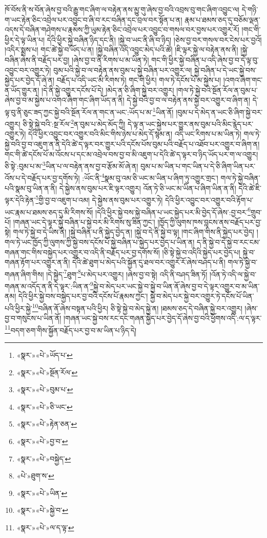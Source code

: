 ཁོ་བོས་ནི་ས་བོན་ཞེས་བྱ་བའི་རྒྱུ་གང་ཞིག་ལ་བརྟེན་ནས་མྱུ་གུ་ཞེས་བྱ་བའི་འབྲས་བུ་གང་ཞིག་འབྱུང་ལ། དེ་གཉི་ག་ཡང་རྟེན་ཅིང་འབྲེལ་པར་འབྱུང་བ་ཞི་བ་རང་བཞིན་དང་བྲལ་བར་སྟོན་པ་ན། རྣམ་པ་ཐམས་ཅད་དུ་བཅོམ་ལྡན་འདས་དེ་བཞིན་གཤེགས་པ་རྣམས་ཀྱི་ཡུམ་རྟེན་ཅིང་འབྲེལ་པར་འབྱུང་བ་གསལ་བར་བྱས་པར་འགྱུར་རོ། །གང་གི་ཕྱིར་དེ་ལྟ་ཡིན་པ། དེའི་ཕྱིར་སྐྱེ་བཞིན་ཉིད་དང་ནི། །སྐྱེ་བ་ཡང་ནི་ཞི་བ་ཉིད། །ཅེས་བྱ་བར་གསལ་བར་ངེས་པར་བྱའོ། །འདིར་སྨྲས་པ། གང་ཚེ་སྐྱེ་བ་ཡོད་པ་ན། །སྐྱེ་བཞིན་འདི་འབྱུང་མེད་པའི་ཚེ། །ཇི་ལྟར་སྐྱེ་ལ་བརྟེན་ནས་ནི། །སྐྱེ་བཞིན་ཞེས་ནི་བརྗོད་པར་བྱ། །ཞེས་བྱ་བ་ནི་རིགས་པ་མ་ཡིན་ཏེ། གང་གི་ཕྱིར་སྐྱེ་བཞིན་པ་འདི་ཞེས་བྱ་བ་དེ་ལྟ་བུ་འབྱུང་བར་འགྱུར་ཏེ། བུམ་པའི་སྐྱེ་བ་ལ་བརྟེན་ནས་བུམ་པ་སྐྱེ་བཞིན་པར་འགྱུར་ལ། སྐྱེ་བཞིན་པ་དེ་ཡང་སྐྱེ་བས་སྐྱེད་པར་བྱེད་དོ་ཞེ་ན། བརྗོད་པ་འདི་ཡང་མི་རིགས་ཏེ། གང་གི་ཕྱིར། གལ་ཏེ་དངོས་པོ་མ་སྐྱེས་པ། །འགའ་ཞིག་གང་ན་ཡོད་གྱུར་ན། །དེ་ནི་སྐྱེ་འགྱུར་དངོས་པོ་དེ། །མེད་ན་ཅི་ཞིག་སྐྱེ་བར་འགྱུར། །གལ་ཏེ་སྐྱེ་བའི་སྔོན་རོལ་ན་བུམ་པ་ཞེས་བྱ་བ་མ་སྐྱེས་པ་འགའ་ཞིག་གང་ཞིག་ཡོད་ན་ནི། དེ་སྐྱེ་བའི་བྱ་བ་ལ་བརྟེན་ནས་སྐྱེ་བར་འགྱུར་བ་ཞིག་ན། དེ་ལྟ་བུ་ནི་ཅུང་ཟད་ཀྱང་སྐྱེ་བའི་སྔོན་རོལ་ན་གང་ན་ཡང་:ཡོད་པ་མ་\footnote{«སྣར་»«པེ་»ཡོད་པ་}ཡིན་ནོ། །བུམ་པ་དེ་མེད་ན་ཡང་ཅི་ཞིག་སྐྱེ་བར་འགྱུར། ཅི་སྟེ་སྐྱེ་བའི་:སྔ་རོལ་\footnote{«སྣར་»«པེ་»སྔོན་རོལ་}ན་བུམ་པ་མེད་མོད་ཀྱི། དེ་ལྟ་ན་ཡང་སྐྱེས་པར་གྱུར་ནས་བུམ་པའི་མིང་རྙེད་པར་འགྱུར་ཏེ། དེའི་ཕྱིར་འབྱུང་བར་འགྱུར་བའི་མིང་གིས་ཉེས་པ་མེད་དོ་སྙམ་ན། འདི་ཡང་རིགས་པ་མ་ཡིན་ཏེ། གལ་ཏེ་སྐྱེ་བའི་བྱ་བ་འཇུག་ན་ནི་དེའི་ཚེ་ད་ལྟར་བར་གྱུར་པའི་དངོས་པོས་བུམ་པའི་བརྗོད་པ་འཐོབ་པར་འགྱུར་བ་ཞིག་ན། གང་གི་ཚེ་དངོས་པོ་མ་འོངས་པ་དང་མ་འབྲེལ་བས་བྱ་བ་མི་འཇུག་པ་དེའི་ཚེ་ད་ལྟར་བ་ཉིད་ཡོད་པར་ག་ལ་འགྱུར། ཅི་སྟེ་:བུམ་པ་མ་\footnote{«སྣར་»«པེ་»བུམ་པ་}ཡིན་པ་ལ་བརྟེན་ནས་བྱ་བ་རྩོམ་མོ་ཞེ་ན། བུམ་པ་མ་ཡིན་པ་གང་ཡིན་པ་དེ་ཅི་ཞིག་ཡིན་པར་འོས་པ་དེ་བརྗོད་པར་བྱ་དགོས་ཏེ། :ཡོང་ནི་\footnote{«སྣར་»«པེ་»ཅི་ཡང་}སྣམ་བུ་འམ་ཅི་ཡང་མ་ཡིན་པ་ཞིག་ཏུ་འགྱུར་གྲང་། གལ་ཏེ་སྐྱེ་བཞིན་པའི་སྣམ་བུ་ཡིན་ན་ནི། དེ་སྐྱེས་ནས་བུམ་པར་ཇི་ལྟར་འགྱུར། འོན་ཏེ་ཅི་ཡང་མ་ཡིན་པ་ཞིག་ཡིན་ན་ནི། དེའི་ཚེ་ཇི་ལྟར་དེའི་རྟེན་\footnote{«སྣར་»«པེ་»རྟེན་ཅན་}གྱི་བྱ་བ་འཇུག་པ་འམ། དེ་སྐྱེས་ནས་བུམ་པར་འགྱུར་ཏེ། དེའི་ཕྱིར་འབྱུང་བར་འགྱུར་བའི་རྟོག་པ་ཡང་རྣམ་པ་ཐམས་ཅད་དུ་མི་རིགས་སོ། །དེའི་ཕྱིར་སྐྱེ་བས་སྐྱེ་བཞིན་པ་ཡང་སྐྱེད་པར་མི་བྱེད་དོ་ཞེས་:བྱ་བར་\footnote{«སྣར་»«པེ་»བྱ་བ་}གྲུབ་པོ། །གཞན་ཡང་དེ་ལྟར་སྐྱེ་བཞིན་པ་སྐྱེ་བར་མི་རིགས་སུ་ཟིན་ཀྱང་། །ཁྱོད་ཀྱི་ལུགས་ཁས་བླངས་ནས་བརྗོད་པར་བྱ་སྟེ། གལ་ཏེ་སྐྱེ་བ་དེ་ཡིས་ནི། །སྐྱེ་བཞིན་པ་ནི་སྐྱེད་བྱེད་ན། །སྐྱེ་བ་དེ་ནི་སྐྱེ་བ་ལྟ། །གང་ཞིག་གིས་ནི་སྐྱེད་པར་བྱེད། །གལ་ཏེ་ཡང་ཁྱོད་ཀྱི་ལུགས་ཀྱི་སྐྱེ་བས་དངོས་པོ་སྐྱེ་བཞིན་པ་སྐྱེད་པར་བྱེད་པ་ཡིན་ན། ད་ནི་སྐྱེ་བ་དེ་སྐྱེ་བ་རང་ངམ་གཞན་གང་གིས་བསྐྱེད་པར་འགྱུར་བ་འདི་ནི་བརྗོད་པར་བྱ་དགོས་སོ། །ཅི་སྟེ་སྐྱེ་བ་འདིའི་སྐྱེད་པར་བྱེད་པ། སྐྱེ་བ་གཞན་རྟོག་པར་འགྱུར་ན་ནི། དེའི་ཚེ་ཐུག་པ་མེད་པའི་སྐྱོན་དུ་ཐལ་བར་འགྱུར་རོ་ཞེས་བཤད་པ་ནི། གལ་ཏེ་སྐྱེ་བ་གཞན་ཞིག་གིས། །དེ་སྐྱེད་\footnote{«སྣར་»«པེ་»བསྐྱེད་}ཐུག་\footnote{«པེ་»ཐུག་ས་}པ་མེད་པར་འགྱུར། །ཞེས་བྱ་བ་སྟེ། འདི་ནི་བཤད་ཟིན་ཏོ། །འོན་ཏེ་འདི་ལ་སྐྱེ་བ་གཞན་མ་འདོད་ན་ནི་དེ་ལྟར་:ཡིན་ན་\footnote{«སྣར་»«པེ་»ཡིན་}སྐྱེ་བ་མེད་པར་ཡང་སྐྱེ་བ་སྐྱེ་བ་ཡིན་ནོ་ཞེས་བྱ་བ་དེ་ལྟར་འགྱུར་བ་མ་ཡིན་ནམ། དེའི་ཕྱིར་སྐྱེ་བས་བསྐྱེད་པར་བྱ་བའི་དངོས་པོ་རྣམས་ཀྱང་། སྐྱེ་བ་མེད་པར་སྐྱེ་བར་འགྱུར་ཏེ་དངོས་པོ་ཡིན་པའི་ཕྱིར་སྐྱེ་\footnote{«སྣར་»«པེ་»སྐྱེ་བ་}བཞིན་ནོ་ཞེས་བསྟན་པའི་ཕྱིར། ཅི་སྟེ་སྐྱེ་བ་མེད་སྐྱེ་ན། །ཐམས་ཅད་དེ་བཞིན་སྐྱེ་བར་འགྱུར། །ཞེས་བྱ་བ་གསུངས་པ་ཡིན་ནོ། །གཞན་ཡང་སྐྱེ་བས་རང་དང་གཞན་སྐྱེད་པར་བྱེད་དོ་ཞེས་བྱ་བའི་ཕྱོགས་འདི་:ལ་ད་ལྟར་\footnote{«སྣར་»«པེ་»ལ་ད་ལྟ་}བདག་ཅག་གིས་སྐྱོན་བརྗོད་པར་བྱ་བ་མ་ཡིན་པ་ཉིད་དེ། 